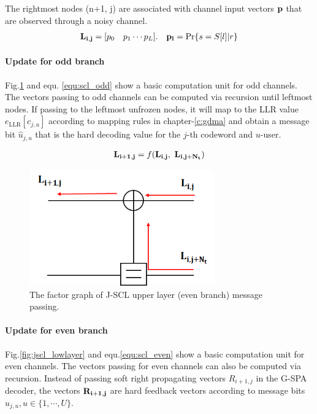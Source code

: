 The rightmost nodes (n+1, j) are associated with channel input vectors $\bf{p}$ that are observed through a noisy channel. 
\begin{align}
{\bf{L_{i,j}}} = [p_0 \quad p_1 \cdots p_L]. \quad {\bf{p_l}} = \text{Pr}\{s=S[l]|r\}
\end{align}

\paragraph{Update for odd branch}

Fig.\ref{fig:jscl_uplayer} and equ. \ref{equ:scl_odd} show a basic computation unit for odd channels. The vectors passing to odd channels can be computed via recursion until leftmost nodes. If passing to the leftmost unfrozen nodes, it will map to the LLR value $e_{\text{LLR}}[c_{j,u}]$ according to mapping rules in chapter-\ref{c:gdma} and obtain a message bit $\hat{u}_{j,u}$ that is the hard decoding value for the $j$-th codeword and $u$-user.

\begin{align}
{\bf{L_{i+1,j}}} = f({\bf L_{i,j}, \ L_{i,j+N_t}})
\label{equ:scl_odd}
\end{align}

\begin{figure}[H]
 \centering
 \includegraphics[width=8cm]{fig/jscl_uplayer.png}
 \caption{The factor graph of J-SCL upper layer (even branch) message passing.}
 \label{fig:jscl_uplayer}
\end{figure}


\paragraph{Update for even branch}
Fig.\ref{fig:jscl_lowlayer} and equ.\ref{equ:scl_even} show a basic computation unit for even channels. The vectors passing for even channels can also be computed via recursion. Instead of passing soft right propagating vectors $R_{i+1,j}$ in the G-SPA decoder, the vectors $\bf R_{i+1,j}$ are hard feedback vectors according to message bits $\hat{u}_{j,u}, u \in \{ 1, \cdots, U\}$.

